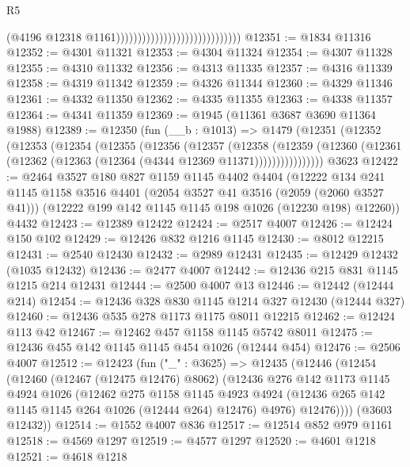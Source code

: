 \begin{lexlean}{R5}
\begin{coremodule}
                                                            (@4196
                                                              @12318
                                                              @1161)))))))))))))))))))))))))))))
@12351 := @1834 @11316
@12352 := @4301 @11321
@12353 := @4304 @11324
@12354 := @4307 @11328
@12355 := @4310 @11332
@12356 := @4313 @11335
@12357 := @4316 @11339
@12358 := @4319 @11342
@12359 := @4326 @11344
@12360 := @4329 @11346
@12361 := @4332 @11350
@12362 := @4335 @11355
@12363 := @4338 @11357
@12364 := @4341 @11359
@12369 := @1945 (@11361 @3687 @3690 @11364 @1988)
@12389 := @12350
    (fun (__b : @1013) =>
    @1479
      (@12351
        (@12352
          (@12353
            (@12354
              (@12355
                (@12356
                  (@12357
                    (@12358
                      (@12359
                        (@12360 (@12361 (@12362 (@12363 (@12364 (@4344 @12369 @11371))))))))))))))))
    @3623
@12422 := @2464
    @3527
    @180
    @827
    @1159
    @1145
    @4402
    @4404
    (@12222
      @134
      @241
      @1145
      @1158
      @3516
      @4401
      (@2054 @3527 @41 @3516 (@2059 (@2060 @3527 @41)))
      (@12222 @199 @142 @1145 @1145 @198 @1026 (@12230 @198) @12260))
    @4432
@12423 := @12389 @12422
@12424 := @2517 @4007
@12426 := @12424 @150 @102
@12429 := @12426 @832 @1216 @1145
@12430 := @8012 @12215
@12431 := @2540 @12430
@12432 := @2989 @12431
@12435 := @12429 @12432 (@1035 @12432)
@12436 := @2477 @4007
@12442 := @12436 @215 @831 @1145 @1215 @214 @12431
@12444 := @2500 @4007 @13
@12446 := @12442 (@12444 @214)
@12454 := @12436 @328 @830 @1145 @1214 @327 @12430 (@12444 @327)
@12460 := @12436 @535 @278 @1173 @1175 @8011 @12215
@12462 := @12424 @113 @42
@12467 := @12462 @457 @1158 @1145 @5742 @8011
@12475 := @12436 @455 @142 @1145 @1145 @454 @1026 (@12444 @454)
@12476 := @2506 @4007
@12512 := @12423
    (fun ("_" : @3625) =>
    @12435
      (@12446
        (@12454
          (@12460
            (@12467 (@12475 @12476) @8062)
            (@12436
              @276
              @142
              @1173
              @1145
              @4924
              @1026
              (@12462
                @275
                @1158
                @1145
                @4923
                @4924
                (@12436 @265 @142 @1145 @1145 @264 @1026 (@12444 @264) @12476)
                @4976)
              @12476))))
      (@3603 @12432))
@12514 := @1552 @4007 @836
@12517 := @12514 @852 @979 @1161
@12518 := @4569 @1297
@12519 := @4577 @1297
@12520 := @4601 @1218
@12521 := @4618 @1218

\end{coremodule}
\end{lexlean}
